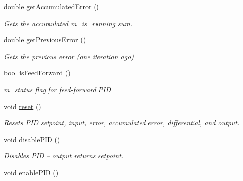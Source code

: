 \begin{DoxyCompactItemize}
double \hyperlink{class_rhesus_1_1_toolkit_1_1_control_1_1_p_i_d_a4ba71ca6864e50a51b1390eb5ad2e490}{get\-Accumulated\-Error} ()
\begin{DoxyCompactList}\small\item\em Gets the accumulated m\-\_\-is\-\_\-running sum. \end{DoxyCompactList}\item 
double \hyperlink{class_rhesus_1_1_toolkit_1_1_control_1_1_p_i_d_a027aeba11f1103dd26b6e982d2d57dc1}{get\-Previous\-Error} ()
\begin{DoxyCompactList}\small\item\em Gets the previous error (one iteration ago) \end{DoxyCompactList}\item 
bool \hyperlink{class_rhesus_1_1_toolkit_1_1_control_1_1_p_i_d_aada2cf1f67c529dc0abfc87e3df599ba}{is\-Feed\-Forward} ()
\begin{DoxyCompactList}\small\item\em m\-\_\-status flag for feed-\/forward \hyperlink{class_rhesus_1_1_toolkit_1_1_control_1_1_p_i_d}{P\-I\-D} \end{DoxyCompactList}\item 
\hypertarget{class_rhesus_1_1_toolkit_1_1_control_1_1_p_i_d_af9677e76cb1beffbcf3f54cbc627c530}{void \hyperlink{class_rhesus_1_1_toolkit_1_1_control_1_1_p_i_d_af9677e76cb1beffbcf3f54cbc627c530}{reset} ()}\label{class_rhesus_1_1_toolkit_1_1_control_1_1_p_i_d_af9677e76cb1beffbcf3f54cbc627c530}

\begin{DoxyCompactList}\small\item\em Resets \hyperlink{class_rhesus_1_1_toolkit_1_1_control_1_1_p_i_d}{P\-I\-D} setpoint, input, error, accumulated error, differential, and output. \end{DoxyCompactList}\item 
\hypertarget{class_rhesus_1_1_toolkit_1_1_control_1_1_p_i_d_a446347f685662ad6de5ba1e2929aedb2}{void \hyperlink{class_rhesus_1_1_toolkit_1_1_control_1_1_p_i_d_a446347f685662ad6de5ba1e2929aedb2}{disable\-P\-I\-D} ()}\label{class_rhesus_1_1_toolkit_1_1_control_1_1_p_i_d_a446347f685662ad6de5ba1e2929aedb2}

\begin{DoxyCompactList}\small\item\em Disables \hyperlink{class_rhesus_1_1_toolkit_1_1_control_1_1_p_i_d}{P\-I\-D} -- output returns setpoint. \end{DoxyCompactList}\item 
\hypertarget{class_rhesus_1_1_toolkit_1_1_control_1_1_p_i_d_a81cb87c22475e6d049a3d2ac3b5d0499}{void \hyperlink{class_rhesus_1_1_toolkit_1_1_control_1_1_p_i_d_a81cb87c22475e6d049a3d2ac3b5d0499}{enable\-P\-I\-D} ()}\label{class_rhesus_1_1_toolkit_1_1_control_1_1_p_i_d_a81cb87c22475e6d049a3d2ac3b5d0499}


\end{DoxyCompactItemize}

